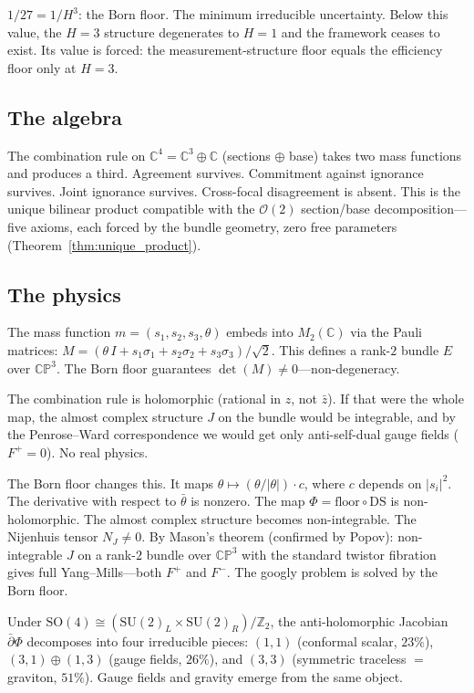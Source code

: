 \documentclass[11pt,a4paper]{article}
\theoremstyle{definition}
\theoremstyle{remark}
\newcommand{\CP}{\mathbb{CP}}
\newcommand{\C}{\mathbb{C}}
\newcommand{\Z}{\mathbb{Z}}
\newcommand{\dbar}{\bar{\partial}}
\newcommand{\SU}{\mathrm{SU}}
\begin{document}
$1/27=1/H^3$: the Born floor. The minimum irreducible uncertainty. Below this value, the $H=3$ structure degenerates to $H=1$ and the framework ceases to exist. Its value is forced: the measurement-structure floor equals the efficiency floor only at $H=3$.

\subsection*{The algebra}

The combination rule on $\C^4=\C^3\oplus\C$ (sections $\oplus$ base) takes two mass functions and produces a third. Agreement survives. Commitment against ignorance survives. Joint ignorance survives. Cross-focal disagreement is absent. This is the unique bilinear product compatible with the $\mathcal{O}(2)$ section/base decomposition---five axioms, each forced by the bundle geometry, zero free parameters (Theorem~\ref{thm:unique_product}).

\subsection*{The physics}

The mass function $m=(s_1,s_2,s_3,\theta)$ embeds into $M_2(\C)$ via the Pauli matrices: $M=(\theta\,I+s_1\sigma_1+s_2\sigma_2+s_3\sigma_3)/\sqrt{2}$. This defines a rank-$2$ bundle $E$ over $\CP^3$. The Born floor guarantees $\det(M)\neq 0$---non-degeneracy.

The combination rule is holomorphic (rational in $z$, not $\bar z$). If that were the whole map, the almost complex structure $J$ on the bundle would be integrable, and by the Penrose--Ward correspondence we would get only anti-self-dual gauge fields ($F^+=0$). No real physics.

The Born floor changes this. It maps $\theta\mapsto(\theta/|\theta|)\cdot c$, where $c$ depends on $|s_i|^2$. The derivative with respect to $\bar\theta$ is nonzero. The map $\Phi=\text{floor}\circ\text{DS}$ is non-holomorphic. The almost complex structure becomes non-integrable. The Nijenhuis tensor $N_J\neq 0$. By Mason's theorem (confirmed by Popov): non-integrable $J$ on a rank-$2$ bundle over $\CP^3$ with the standard twistor fibration gives full Yang--Mills---both $F^+$ and $F^-$. The googly problem is solved by the Born floor.

Under $\mathrm{SO}(4)\cong(\SU(2)_L\times\SU(2)_R)/\Z_2$, the anti-holomorphic Jacobian $\dbar\Phi$ decomposes into four irreducible pieces: $(1,1)$ (conformal scalar, $23\%$), $(3,1)\oplus(1,3)$ (gauge fields, $26\%$), and $(3,3)$ (symmetric traceless $=$ graviton, $51\%$). Gauge fields and gravity emerge from the same object.
\end{document}
